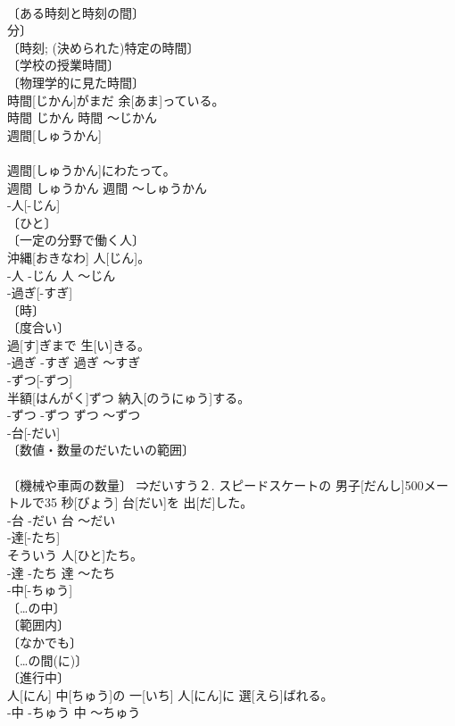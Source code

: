 \documentclass[8pt]{extreport}
\begin{document}
\begin{CJK}{UTF8}{min}
\\	〔ある時刻と時刻の間〕 
\\	分〕 
\\	〔時刻; (決められた)特定の時間〕 
\\	〔学校の授業時間〕 
\\	〔物理学的に見た時間〕 
\\	時間[じかん]がまだ 余[あま]っている。	
\\	時間	じかん	時間	〜じかん	
\\	週間[しゅうかん]	
\\	[⇒しゅう７]	
\\	週間[しゅうかん]にわたって。	
\\	週間	しゅうかん	週間	〜しゅうかん	
\\	-人[-じん]	
\\	〔ひと〕 
\\	〔一定の分野で働く人〕 
\\	沖縄[おきなわ] 人[じん]。	
\\	-人	-じん	人	〜じん	
\\	-過ぎ[-すぎ]	
\\	〔時〕 
\\	〔度合い〕 
\\	過[す]ぎまで 生[い]きる。	
\\	-過ぎ	-すぎ	過ぎ	〜すぎ	
\\	-ずつ[-ずつ]	
\\	半額[はんがく]ずつ 納入[のうにゅう]する。	
\\	-ずつ	-ずつ	ずつ	〜ずつ	
\\	-台[-だい]	
\\	〔数値・数量のだいたいの範囲〕 
\\	[⇒-だい２] 
\\	〔機械や車両の数量〕 ⇒だいすう２.	スピードスケートの 男子[だんし]500メートルで35 秒[びょう] 台[だい]を 出[だ]した。	
\\	-台	-だい	台	〜だい	
\\	-達[-たち]	
\\	そういう 人[ひと]たち。	
\\	-達	-たち	達	〜たち	
\\	-中[-ちゅう]	
\\	〔…の中〕 
\\	〔範囲内〕 
\\	〔なかでも〕 
\\	〔…の間(に)〕 
\\	〔進行中〕 
\\	人[にん] 中[ちゅう]の 一[いち] 人[にん]に 選[えら]ばれる。	
\\	-中	-ちゅう	中	〜ちゅう	

\end{CJK}
\end{document}
